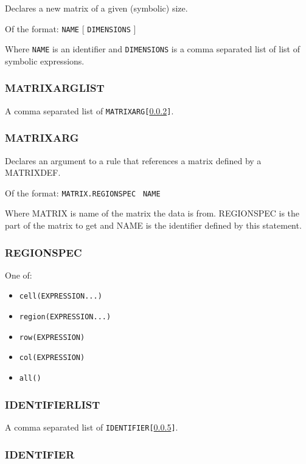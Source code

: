\documentclass[11pt]{article}
\begin{document}
Declares a new matrix of a given (symbolic) size.

Of the format: {\tt NAME} [ {\tt DIMENSIONS} ] 

Where {\tt NAME} is an identifier and {\tt DIMENSIONS} is a comma separated
list of list of symbolic expressions.

\subsubsection{MATRIXARGLIST}
\label{MATRIXARGLIST}

A comma separated list of {\tt MATRIXARG[\ref{MATRIXARG}]}.

\subsubsection{MATRIXARG}
\label{MATRIXARG}

Declares an argument to a rule that references a matrix defined by a MATRIXDEF.

Of the format: {\tt MATRIX.REGIONSPEC } {\tt NAME}

Where MATRIX is name of the matrix the data is from.  REGIONSPEC is the part
of the matrix to get and NAME is the identifier defined by this statement.

\subsubsection{REGIONSPEC}

One of:

\begin{itemize}
\item \tt cell(EXPRESSION...)
\item \tt region(EXPRESSION...)
\item \tt row(EXPRESSION)
\item \tt col(EXPRESSION)
\item \tt all()

\end{itemize}

\subsubsection{IDENTIFIERLIST}
\label{IDENTIFIERLIST}

A comma separated list of {\tt IDENTIFIER[\ref{IDENTIFIER}]}.

\subsubsection{IDENTIFIER}
\label{IDENTIFIER}
\end{document}
